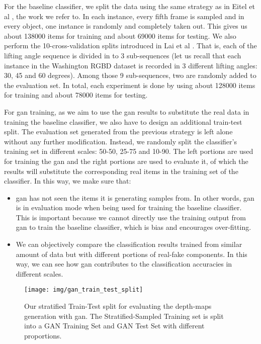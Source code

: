 For the baseline classifier, we split the data using the same strategy as in Eitel et al
\cite{eitel}, the work we refer to. In each instance, every fifth frame is sampled
and in every object, one instance is randomly and completely taken out. This gives us
about 138000 items for training and about 69000 items for testing.  We also perform the
10-cross-validation splits introduced in Lai et al \cite{washington_rgbd}. That is, each of the
lifting angle sequence is divided in to 3 sub-sequences (let us recall that each instance
in the Washington RGBD dataset is recorded in 3 different lifting angles: 30, 45 and 60
degrees).  Among those 9 sub-sequences, two are randomly added to the evaluation set. In
total, each experiment is done by using about 128000 items for training and about 78000
items for testing.

For \acrshort{gan} training, as we aim to use the \acrshort{gan} results to substitute
the real data in training the baseline classifier, we also have to design an additional
train-test split. The evaluation set generated from the previous strategy is left alone
without any further modification. Instead, we randomly split the classifier's training set
in different scales: 50-50, 25-75 and 10-90. The left portions are used for training the
\acrshort{gan} and the right portions are used to evaluate it, of which the results will
substitute the corresponding real items in the training set of the classifier. In this
way, we make sure that:

\begin{itemize}
	\item \acrshort{gan} has not seen the items it is generating samples from. In
		other words, \acrshort{gan} is in evaluation mode when being used for training the
		baseline classifier. This is important because we cannot directly use the training output
		from \acrshort{gan} to train the baseline classifier, which is bias and encourages over-fitting.
	\item We can objectively compare the classification results trained from similar
		amount of data but with different portions of real-fake components. In this way,
		we can see how \acrshort{gan} contributes to the classification accuracies in
		different scales.
\end{itemize}

\begin{figure}[h]
	\centering
	\texttt{[image: img/gan\_train\_test\_split]}
	\caption{Our stratified Train-Test split for evaluating the depth-maps generation with
		\acrshort{gan}. The Stratified-Sampled Training set is split into a GAN Training
		Set and GAN Test Set with different proportions.}
	\label{fig:gan_train_test_split}
\end{figure}

